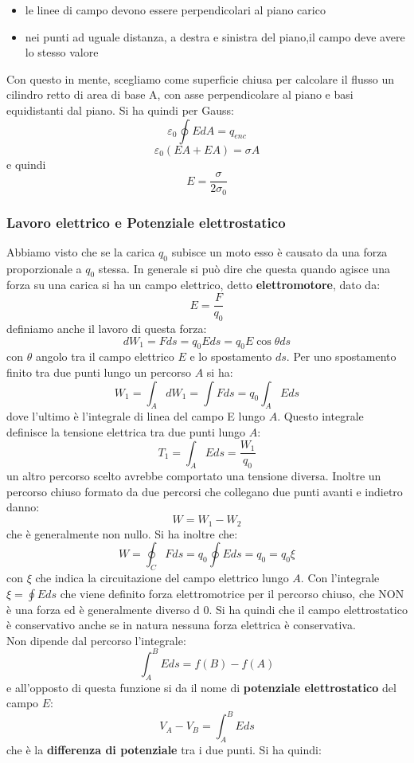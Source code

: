 \documentclass[a4paper,12pt, oneside]{book}
\begin{document}
\begin{itemize}
	      \begin{itemize}
		      \item le linee di campo devono essere perpendicolari al piano carico
		      \item nei punti ad uguale distanza, a destra e sinistra del piano,il campo deve avere lo stesso valore
	      \end{itemize}
	      Con questo in mente, scegliamo come superficie chiusa per calcolare il flusso un cilindro retto di area di base A, con asse perpendicolare al piano e basi equidistanti dal piano. Si ha quindi per Gauss:
	      $$\varepsilon_0\oint EdA=q_{enc}$$
	      $$\varepsilon_0(EA+EA)=\sigma A$$
	      e quindi
	      $$E=\frac{\sigma}{2\sigma_0}$$
\end{itemize}
\newpage
\subsubsection{Lavoro elettrico e Potenziale elettrostatico}
Abbiamo visto che se la carica $q_0$ subisce un moto esso è causato da una forza proporzionale a $q_0$ stessa. In generale si può dire che questa quando agisce una forza su una carica si ha un campo elettrico, detto \textbf{elettromotore}, dato da:
$$E=\frac{F}{q_0}$$
definiamo anche il lavoro di questa forza:
$$dW_1=Fds=q_0Eds=q_0E\cos \theta ds$$
con $\theta$ angolo tra il campo elettrico $E$ e lo spostamento $ds$. Per uno spostamento finito tra due punti lungo un percorso $A$ si ha:
$$W_1=\int_A dW_1=\int Fds=q_0\int_A Eds$$
dove l'ultimo è l'integrale di linea del campo E lungo $A$. Questo integrale definisce la tensione elettrica tra due punti lungo $A$:
$$T_1=\int_AEds=\frac{W_1}{q_0}$$
un altro percorso scelto avrebbe comportato una tensione diversa. Inoltre un percorso chiuso formato da due percorsi che collegano due punti avanti e indietro danno:
$$W=W_1-W_2$$
che è generalmente non nullo. Si ha inoltre che:
$$W=\oint_C Fds=q_0\oint Eds=q_0=q_0\xi$$
con $\xi$ che indica la circuitazione del campo elettrico lungo $A$. Con l'integrale $\xi=\oint Eds$ che viene definito forza elettromotrice per il percorso chiuso, che NON è una forza ed è generalmente diverso d 0. Si ha quindi che il campo elettrostatico è conservativo anche se in natura nessuna forza elettrica è conservativa.\\
Non dipende dal percorso l'integrale:
$$\int_A^B Eds=f(B)-f(A)$$
e all'opposto di questa funzione si da il nome di \textbf{potenziale elettrostatico} del campo $E$:
$$V_A-V_B=\int_A^B Eds$$
che è la \textbf{differenza di potenziale} tra i due punti. Si ha quindi:
\end{document}
